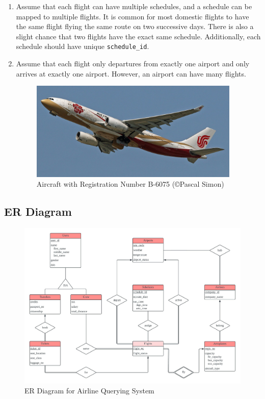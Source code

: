 \documentclass{article}
\begin{document}
\begin{enumerate}
		\item Assume that each flight can have multiple schedules, and a schedule can be mapped to multiple flights. It is common for most domestic flights to have the same flight flying the same route on two successive days. There is also a slight chance that two flights have the exact same schedule. Additionally, each schedule should have unique \texttt{schedule\_id}.
		
		\item Assume that each flight only departures from exactly one airport and only arrives at exactly one airport. However, an airport can have many flights.
		
		\begin{figure}[H]
			\centering
			\includegraphics[width=100mm]{CSDS341_Project_B-6075.jpg}
			\caption{Aircraft with Registration Number B-6075 (\copyright Pascal Simon)}
		\end{figure}
		
	\end{enumerate}
	
	\subsection{ER Diagram}
	
	\begin{figure}[H]
		\centering
		\includegraphics[width=140mm]{CSDS341_Project_ER_Diagram.jpeg}
		\caption{ER Diagram for Airline Querying System}
	\end{figure}
	
\end{document}
